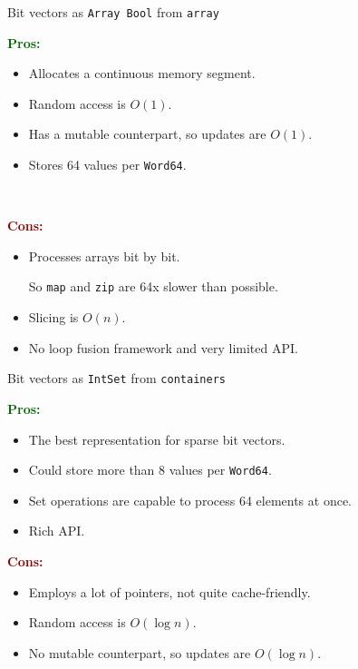 \documentclass[handout]{beamer}
\def\pros{\textcolor{darkgreen}{\bf Pros:} }
\def\cons{\textcolor{darkred}{\bf Cons:} }
\begin{document}
\begin{frame}{Bit vectors as {\tt Array Bool} from {\tt array}}

\pros

\begin{itemize}
\item Allocates a continuous memory segment.
\item Random access is $O(1)$.
\item Has a mutable counterpart, so updates are $O(1)$.
\item Stores 64 values per {\tt Word64}. \par ~
\end{itemize}

\pause

\cons

\begin{itemize}
\item Processes arrays bit by bit. \par
      So {\tt map} and {\tt zip} are 64x slower than possible.
\item Slicing is $O(n)$.
\item No loop fusion framework and very limited API.
\end{itemize}

\end{frame}

\begin{frame}{Bit vectors as {\tt IntSet} from {\tt containers}}

\pros

\begin{itemize}
\item The best representation for sparse bit vectors.
\item Could store more than 8 values per {\tt Word64}.
\item Set operations are capable to process 64 elements at once.
\item Rich API.
\end{itemize}

\pause

\cons

\begin{itemize}
\item Employs a lot of pointers, not quite cache-friendly.
\item Random access is $O(\log n)$.
\item No mutable counterpart, so updates are $O(\log n)$. \par ~
\end{itemize}

\end{frame}
\end{document}
